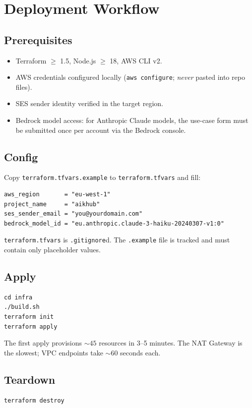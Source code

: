 \documentclass[11pt,a4paper]{article}
\begin{document}
\section{Deployment Workflow}

\subsection{Prerequisites}
\begin{itemize}[leftmargin=*]
  \item Terraform $\geq$ 1.5, Node.js $\geq$ 18, AWS CLI v2.
  \item AWS credentials configured locally (\texttt{aws configure}; \emph{never} pasted into repo files).
  \item SES sender identity verified in the target region.
  \item Bedrock model access: for Anthropic Claude models, the use-case form must be submitted once per account via the Bedrock console.
\end{itemize}

\subsection{Config}
Copy \texttt{terraform.tfvars.example} to \texttt{terraform.tfvars} and fill:
\begin{lstlisting}[language=hcl]
aws_region       = "eu-west-1"
project_name     = "aikhub"
ses_sender_email = "you@yourdomain.com"
bedrock_model_id = "eu.anthropic.claude-3-haiku-20240307-v1:0"
\end{lstlisting}

\texttt{terraform.tfvars} is \texttt{.gitignore}d. The \texttt{.example} file is tracked and must contain only placeholder values.

\subsection{Apply}
\begin{lstlisting}[basicstyle=\ttfamily\small]
cd infra
./build.sh
terraform init
terraform apply
\end{lstlisting}

The first apply provisions ${\sim}45$ resources in 3--5 minutes. The NAT Gateway is the slowest; VPC endpoints take ${\sim}60$ seconds each.

\subsection{Teardown}
\begin{lstlisting}[basicstyle=\ttfamily\small]
terraform destroy
\end{lstlisting}
\end{document}
